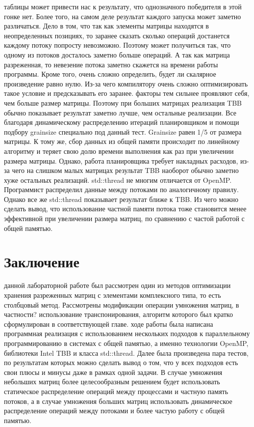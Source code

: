 \documentclass[12pt]{report}
\begin{document}
 таблицы может привести нас к результату, что однозначного победителя в этой гонке нет. Более того, на самом деле результат каждого запуска может заметно различаться. Дело в том, что так как элементы матрицы находятся в неопределенных позициях, то заранее сказать сколько операций достанется каждому потоку попросту невозможно. Поэтому может получиться так, что одному из потоков досталось заметно больше операций. А так как матрица разреженная, то невезение потока заметно скажется на времени работы программы. Кроме того, очень сложно определить, будет ли скалярное произведение равно нулю. Из-за чего компилятору очень сложно оптимизировать такое условие и предсказывать его заранее.
 факторы тем сильнее проявляют себя, чем больше размер матрицы. Поэтому при больших матрицах реализация TBB обычно показывает результат заметно лучше, чем остальные реализации. Все благодаря динамическому распределению итераций планировщиком и помощи подбору grainsize специально под данный тест. Grainsize равен 1/5 от размера матрицы. К тому же, сбор данных из общей памяти происходит по линейному алгоритму и теряет свою долю времени выполнения как раз при увеличении размера матрицы. Однако, работа планировщика требует накладных расходов, из-за чего на слишком малых матрицах результат TBB наоборот обычно заметно хуже остальных реализаций.
 std::thread не многим отличается от OpenMP. Программист распределил данные между потоками по аналогичному правилу. Однако все же std::thread показывает результат ближе к TBB. Из чего можно сделать вывод, что использование частной памяти потока тоже становится менее эффективной при увеличении размера матриц, по сравнению с частой работой с общей памятью.

\newpage

\section*{Заключение}
 данной лабораторной работе был рассмотрен один из методов оптимизации хранения разреженных матриц с элементами комплексного типа, то есть столбцовый метод. Рассмотрены модификации операции умножения матриц, в частности? использование транспонирования, алгоритм которого был кратко сформулирован в соответствующей главе.
 ходе работы была написана программная реализация с использованием нескольких подходов к параллельному программированию в системах с общей памятью, а именно технологии OpenMP, библиотеки Intel TBB и класса std::thread. Далее была произведена пара тестов, по результатам которых можно сделать вывод о том, что у всех подходов есть свои плюсы и минусы даже в рамках одной задачи. В случае умножения небольших матриц более целесообразным решением будет использовать статическое распределение операций между процессами и частную память потоков, а в случае умножения больших матриц использовать динамическое распределение операций между потоками и более частую работу с общей памятью.
\end{document}
